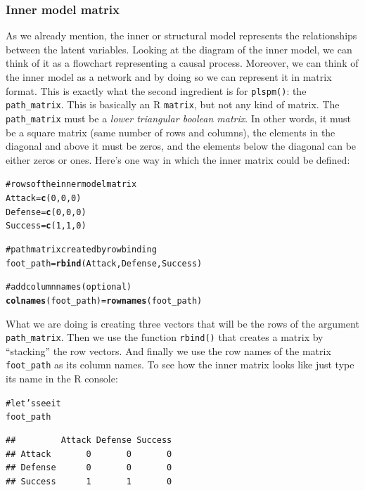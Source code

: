 \documentclass[12pt]{book}\usepackage{graphicx, color}
\makeatletter
\newcommand{\hlfunctioncall}[1]{\textcolor[rgb]{0.501960784313725,0,0.329411764705882}{\textbf{#1}}}%
\newcommand{\hlcomment}[1]{\textcolor[rgb]{0.180392156862745,0.6,0.341176470588235}{#1}}%
\newenvironment{kframe}{%
 \def\at@end@of@kframe{}%
 \ifinner\ifhmode%
  \def\at@end@of@kframe{\end{minipage}}%
  \begin{minipage}{\columnwidth}%
 \fi\fi%
 \def\FrameCommand##1{\hskip\@totalleftmargin \hskip-\fboxsep
 \colorbox{shadecolor}{##1}\hskip-\fboxsep
     \hskip-\linewidth \hskip-\@totalleftmargin \hskip\columnwidth}%
 \MakeFramed {\advance\hsize-\width
   \@totalleftmargin\z@ \linewidth\hsize
   \@setminipage}}%
 {\par\unskip\endMakeFramed%
 \at@end@of@kframe}
\newenvironment{knitrout}{}{} %
\newcommand{\fplspm}{\texttt{plspm()}}
\newcommand{\code}[1]{\texttt{#1}}
\makeatother
\begin{document}
\subsubsection*{Inner model matrix}
As we already mention, the inner or structural model represents the relationships between the latent variables. Looking at the diagram of the inner model, we can think of it as a flowchart representing a causal process. Moreover, we can think of the inner model as a network and by doing so we can represent it in matrix format. This is exactly what the second ingredient is for \fplspm{}: the \code{path\_matrix}. This is basically an R \code{matrix}, but not any kind of matrix. The \code{path\_matrix} must be a \textit{lower triangular boolean matrix}. In other words, it must be a square matrix (same number of rows and columns), the elements in the diagonal and above it must be zeros, and the elements below the diagonal can be either zeros or ones. Here's one way in which the inner matrix could be defined:
\begin{knitrout}
\color{fgcolor}\begin{kframe}
\begin{alltt}
\hlcomment{# rows of the inner model matrix}
Attack = \hlfunctioncall{c}(0, 0, 0)
Defense = \hlfunctioncall{c}(0, 0, 0)
Success = \hlfunctioncall{c}(1, 1, 0)

\hlcomment{# path matrix created by row binding}
foot_path = \hlfunctioncall{rbind}(Attack, Defense, Success)

\hlcomment{# add column names (optional)}
\hlfunctioncall{colnames}(foot_path) = \hlfunctioncall{rownames}(foot_path)
\end{alltt}
\end{kframe}
\end{knitrout}

What we are doing is creating three vectors that will be the rows of the argument \code{path\_matrix}. Then we use the function \code{rbind()} that creates a matrix by ``stacking'' the row vectors. And finally we use the row names of the matrix \code{foot\_path} as its column names. To see how the inner matrix looks like just type its name in the R console:

\begin{knitrout}
\color{fgcolor}\begin{kframe}
\begin{alltt}
\hlcomment{# let's see it}
foot_path
\end{alltt}
\begin{verbatim}
##         Attack Defense Success
## Attack       0       0       0
## Defense      0       0       0
## Success      1       1       0
\end{verbatim}
\end{kframe}
\end{knitrout}
\end{document}
